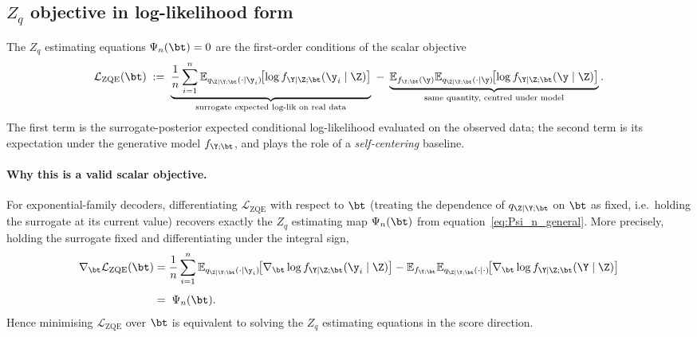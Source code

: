 
\subsection*{$Z_q$ objective in log-likelihood form}

The $Z_q$ estimating equations $\Psi_n(\bt) = 0$ are the first-order conditions of the
scalar objective
%
\begin{equation}
  \mathcal{L}_{\mathrm{ZQE}}(\bt)
  \;:=\;
  \underbrace{
    \frac{1}{n}\sum_{i=1}^n
    \mathbb{E}_{q_{\Z\mid\Y;\bt}(\cdot\mid\y_i)}
    \!\bigl[\log f_{\Y\mid\Z;\bt}(\y_i\mid\Z)\bigr]
  }_{\text{surrogate expected log-lik on real data}}
  \;-\;
  \underbrace{
    \mathbb{E}_{f_{\Y;\bt}(\y)}
    \mathbb{E}_{q_{\Z\mid\Y;\bt}(\cdot\mid\y)}
    \!\bigl[\log f_{\Y\mid\Z;\bt}(\y\mid\Z)\bigr]
  }_{\text{same quantity, centred under model}}.
  \label{eq:L_ZQE}
\end{equation}
%
The first term is the surrogate-posterior expected conditional log-likelihood evaluated
on the observed data; the second term is its expectation under the generative model
$f_{\Y;\bt}$, and plays the role of a \emph{self-centering} baseline.

\paragraph{Why this is a valid scalar objective.}
For exponential-family decoders, differentiating $\mathcal{L}_{\mathrm{ZQE}}$ with
respect to $\bt$ (treating the dependence of $q_{\Z\mid\Y;\bt}$ on $\bt$ as fixed,
i.e.\ holding the surrogate at its current value) recovers exactly the $Z_q$ estimating
map $\Psi_n(\bt)$ from equation~\eqref{eq:Psi_n_general}.
More precisely, holding the surrogate fixed and differentiating under the integral sign,
%
\begin{align*}
  \nabla_\bt \mathcal{L}_{\mathrm{ZQE}}(\bt)
  &=
  \frac{1}{n}\sum_{i=1}^n
  \mathbb{E}_{q_{\Z\mid\Y;\bt}(\cdot\mid\y_i)}
  \!\bigl[\nabla_\bt \log f_{\Y\mid\Z;\bt}(\y_i\mid\Z)\bigr]
  -
  \mathbb{E}_{f_{\Y;\bt}}
  \mathbb{E}_{q_{\Z\mid\Y;\bt}(\cdot\mid\cdot)}
  \!\bigl[\nabla_\bt \log f_{\Y\mid\Z;\bt}(\Y\mid\Z)\bigr]
  \\[4pt]
  &=\;
  \Psi_n(\bt).
\end{align*}
%
Hence minimising $\mathcal{L}_{\mathrm{ZQE}}$ over $\bt$ is equivalent to solving the
$Z_q$ estimating equations in the score direction.

